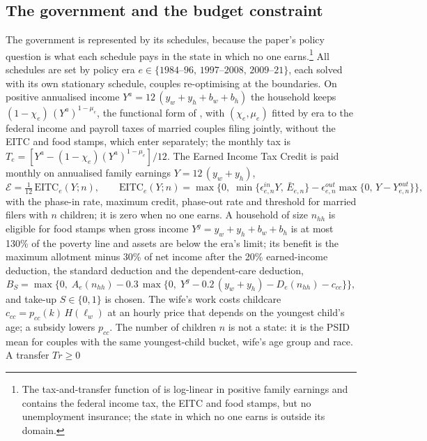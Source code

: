 \subsection{The government and the budget constraint}

The government is represented by its schedules, because the paper's policy question is what each schedule pays in
the state in which no one earns.\footnote{The tax-and-transfer function of \citet{blundell2016consumption} is
log-linear in positive family earnings and contains the federal income tax, the EITC and food stamps, but no
unemployment insurance; the state in which no one earns is outside its domain.} All schedules are set by policy era
$e \in \{1984\text{--}96,\, 1997\text{--}2008,\, 2009\text{--}21\}$, each solved with its own stationary schedule,
couples re-optimising at the boundaries. On positive annualised income $Y^a = 12\,(y_w + y_h + b_w + b_h)$ the
household keeps $(1 - \chi_e)\,(Y^a)^{1 - \mu_e}$, the functional form of \citet{blundell2016consumption}, with
$(\chi_e, \mu_e)$ fitted by era to the federal income and payroll taxes of married couples filing jointly, without the
EITC and food stamps, which enter separately; the monthly tax is $T_e = [Y^a - (1-\chi_e)(Y^a)^{1-\mu_e}]/12$. The
Earned Income Tax Credit is paid monthly on annualised family earnings $Y = 12\,(y_w + y_h)$,
\begin{equation}\label{eq:eitc}
  \mathcal E = \tfrac{1}{12}\,\mathrm{EITC}_e(Y; n), \qquad
  \mathrm{EITC}_e(Y; n) = \max\Big\{0,\; \min\{\epsilon^{in}_{e,n} Y,\, \bar E_{e,n}\} - \epsilon^{out}_{e,n}\max\{0,\, Y - Y^{out}_{e,n}\}\Big\},
\end{equation}
with the phase-in rate, maximum credit, phase-out rate and threshold for married filers with $n$ children; it is zero
when no one earns. A household of size $n_{hh}$ is eligible for food stamps when gross income
$Y^g = y_w + y_h + b_w + b_h$ is at most 130\% of the poverty line and assets are below the era's limit; its benefit is
the maximum allotment minus 30\% of net income after the 20\% earned-income deduction, the standard deduction and the
dependent-care deduction,
\[
  B_S = \max\big\{0,\; A_e(n_{hh}) - 0.3\,\max\{0,\; Y^g - 0.2\,(y_w + y_h) - D_e(n_{hh}) - c_{cc}\}\big\},
\]
and take-up $S \in \{0, 1\}$ is chosen. The wife's work costs childcare $c_{cc} = p_{cc}(k)\,H(\ell_w)$ at an hourly
price that depends on the youngest child's age; a subsidy lowers $p_{cc}$. The number of children $n$ is not a state:
it is the PSID mean for couples with the same youngest-child bucket, wife's age group and race. A transfer $Tr \ge 0$

